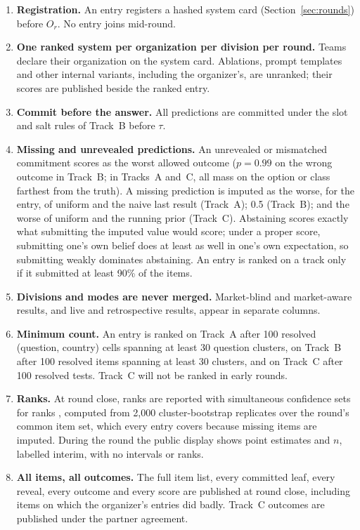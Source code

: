 \documentclass[11pt]{article}
\begin{document}
\begin{enumerate}
  \item \textbf{Registration.} An entry registers a hashed system card (Section~\ref{sec:rounds}) before $O_r$. No entry joins mid-round.
  \item \textbf{One ranked system per organization per division per round.} Teams declare their organization on the system card. Ablations, prompt templates and other internal variants, including the organizer's, are unranked; their scores are published beside the ranked entry.
  \item \textbf{Commit before the answer.} All predictions are committed under the slot and salt rules of Track~B before $\tau$.
  \item \label{rule:missing}\textbf{Missing and unrevealed predictions.} An unrevealed or mismatched commitment scores as the worst allowed outcome ($p = 0.99$ on the wrong outcome in Track~B; in Tracks~A and~C, all mass on the option or class farthest from the truth). A missing prediction is imputed as the worse, for the entry, of uniform and the naive last result (Track~A); 0.5 (Track~B); and the worse of uniform and the running prior (Track~C). Abstaining scores exactly what submitting the imputed value would score; under a proper score, submitting one's own belief does at least as well in one's own expectation, so submitting weakly dominates abstaining. An entry is ranked on a track only if it submitted at least 90\% of the items.
  \item \textbf{Divisions and modes are never merged.} Market-blind and market-aware results, and live and retrospective results, appear in separate columns.
  \item \textbf{Minimum count.} An entry is ranked on Track~A after 100 resolved (question, country) cells spanning at least 30 question clusters, on Track~B after 100 resolved items spanning at least 30 clusters, and on Track~C after 100 resolved tests. Track~C will not be ranked in early rounds.
  \item \textbf{Ranks.} At round close, ranks are reported with simultaneous confidence sets for ranks \citep{mogstad2024ranks}, computed from 2{,}000 cluster-bootstrap replicates over the round's common item set, which every entry covers because missing items are imputed. During the round the public display shows point estimates and $n$, labelled interim, with no intervals or ranks.
  \item \textbf{All items, all outcomes.} The full item list, every committed leaf, every reveal, every outcome and every score are published at round close, including items on which the organizer's entries did badly. Track~C outcomes are published under the partner agreement.

\end{enumerate}
\end{document}
